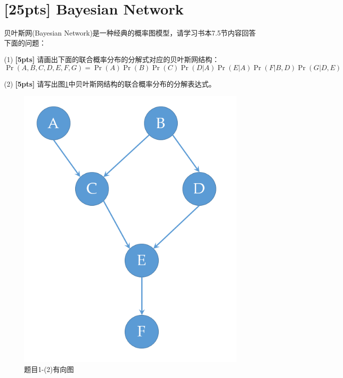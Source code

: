 \documentclass[a4paper,UTF8]{article}
\theoremstyle{definition}
\begin{document}
	\newpage




\section{\textbf{[25pts]} Bayesian Network}
贝叶斯网(Bayesian Network)是一种经典的概率图模型，请学习书本7.5节内容回答下面的问题：

(1) \textbf{[5pts]} 请画出下面的联合概率分布的分解式对应的贝叶斯网结构：
\begin{equation*}
\Pr(A, B, C, D, E, F, G) = \Pr(A)\Pr(B)\Pr(C)\Pr(D|A)\Pr(E|A)\Pr(F|B, D)\Pr(G|D, E)
\end{equation*}

(2) \textbf{[5pts]} 请写出图\ref{fig-DAG}中贝叶斯网结构的联合概率分布的分解表达式。
\begin{figure}[h]
\centering
\includegraphics[scale=0.3]{bayes_net.png}
\caption{题目1-(2)有向图}
\label{fig-DAG}
\end{figure}
\newcommand{\cmark}{\ding{51}}%
\newcommand{\xmark}{\ding{55}}%
\end{document}
